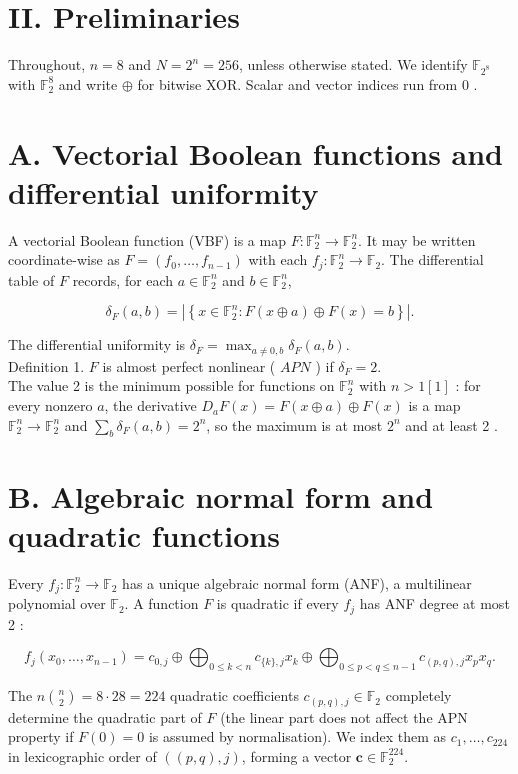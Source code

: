 \documentclass[10pt]{article}
\begin{document}
\section*{II. Preliminaries}
Throughout, $n=8$ and $N=2^{n}=256$, unless otherwise stated. We identify $\mathbb{F}_{2^{8}}$ with $\mathbb{F}_{2}^{8}$ and write $\oplus$ for bitwise XOR. Scalar and vector indices run from 0 .

\section*{A. Vectorial Boolean functions and differential uniformity}
A vectorial Boolean function (VBF) is a map $F: \mathbb{F}_{2}^{n} \rightarrow \mathbb{F}_{2}^{n}$. It may be written coordinate-wise as $F=\left(f_{0}, \ldots, f_{n-1}\right)$ with each $f_{j}: \mathbb{F}_{2}^{n} \rightarrow \mathbb{F}_{2}$. The differential table of $F$ records, for each $a \in \mathbb{F}_{2}^{n}$ and $b \in \mathbb{F}_{2}^{n}$,

$$
\delta_{F}(a, b)=\left|\left\{x \in \mathbb{F}_{2}^{n}: F(x \oplus a) \oplus F(x)=b\right\}\right| .
$$

The differential uniformity is $\delta_{F}=\max _{a \neq 0, b} \delta_{F}(a, b)$.\\
Definition 1. $F$ is almost perfect nonlinear ( $A P N$ ) if $\delta_{F}=2$.\\
The value 2 is the minimum possible for functions on $\mathbb{F}_{2}^{n}$ with $n>1[1]$ : for every nonzero $a$, the derivative $D_{a} F(x)= F(x \oplus a) \oplus F(x)$ is a map $\mathbb{F}_{2}^{n} \rightarrow \mathbb{F}_{2}^{n}$ and $\sum_{b} \delta_{F}(a, b)=2^{n}$, so the maximum is at most $2^{n}$ and at least 2 .

\section*{B. Algebraic normal form and quadratic functions}
Every $f_{j}: \mathbb{F}_{2}^{n} \rightarrow \mathbb{F}_{2}$ has a unique algebraic normal form (ANF), a multilinear polynomial over $\mathbb{F}_{2}$. A function $F$ is quadratic if every $f_{j}$ has ANF degree at most 2 :

$$
f_{j}\left(x_{0}, \ldots, x_{n-1}\right)=c_{0, j} \oplus \bigoplus_{0 \leq k<n} c_{\{k\}, j} x_{k} \oplus \bigoplus_{0 \leq p<q \leq n-1} c_{(p, q), j} x_{p} x_{q} .
$$

The $n\binom{n}{2}=8 \cdot 28=224$ quadratic coefficients $c_{(p, q), j} \in \mathbb{F}_{2}$ completely determine the quadratic part of $F$ (the linear part does not affect the APN property if $F(0)=0$ is assumed by normalisation). We index them as $c_{1}, \ldots, c_{224}$ in lexicographic order of $((p, q), j)$, forming a vector $\mathbf{c} \in \mathbb{F}_{2}^{224}$.
\end{document}
